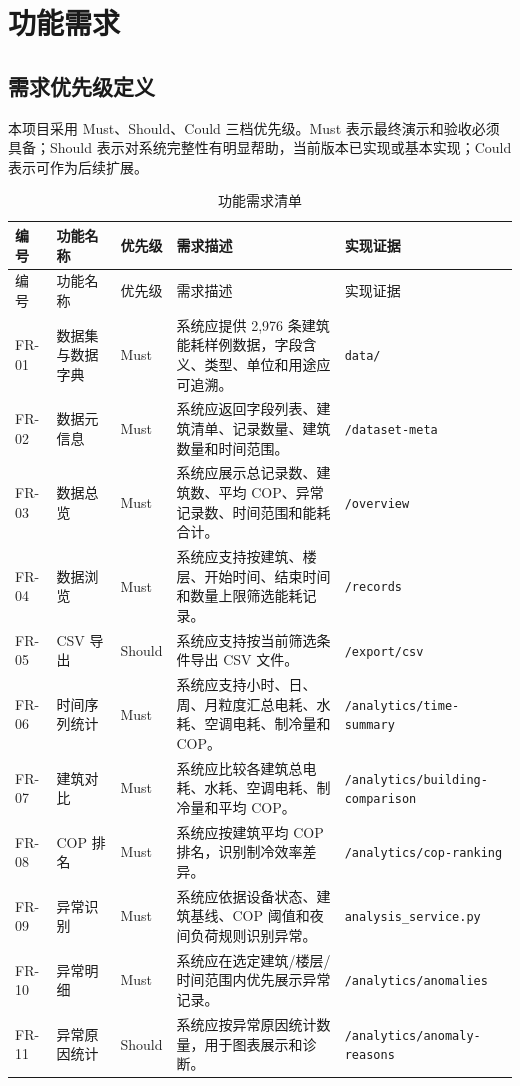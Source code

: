 \documentclass[12pt,a4paper]{ctexart}
\newcommand{\code}[1]{{\footnotesize\nolinkurl{#1}}}
\begin{document}
\section{功能需求}
\subsection{需求优先级定义}
本项目采用 Must、Should、Could 三档优先级。Must 表示最终演示和验收必须具备；Should 表示对系统完整性有明显帮助，当前版本已实现或基本实现；Could 表示可作为后续扩展。

\begin{longtable}{p{2cm}p{3.5cm}p{1.7cm}p{5.3cm}p{2.2cm}}
\caption{功能需求清单}\\
\toprule
编号 & 功能名称 & 优先级 & 需求描述 & 实现证据 \\
\midrule
\endfirsthead
\toprule
编号 & 功能名称 & 优先级 & 需求描述 & 实现证据 \\
\midrule
\endhead
FR-01 & 数据集与数据字典 & Must & 系统应提供 2,976 条建筑能耗样例数据，字段含义、类型、单位和用途应可追溯。 & \code{data/} \\
FR-02 & 数据元信息 & Must & 系统应返回字段列表、建筑清单、记录数量、建筑数量和时间范围。 & \code{/dataset-meta} \\
FR-03 & 数据总览 & Must & 系统应展示总记录数、建筑数、平均 COP、异常记录数、时间范围和能耗合计。 & \code{/overview} \\
FR-04 & 数据浏览 & Must & 系统应支持按建筑、楼层、开始时间、结束时间和数量上限筛选能耗记录。 & \code{/records} \\
FR-05 & CSV 导出 & Should & 系统应支持按当前筛选条件导出 CSV 文件。 & \code{/export/csv} \\
FR-06 & 时间序列统计 & Must & 系统应支持小时、日、周、月粒度汇总电耗、水耗、空调电耗、制冷量和 COP。 & \code{/analytics/time-summary} \\
FR-07 & 建筑对比 & Must & 系统应比较各建筑总电耗、水耗、空调电耗、制冷量和平均 COP。 & \code{/analytics/building-comparison} \\
FR-08 & COP 排名 & Must & 系统应按建筑平均 COP 排名，识别制冷效率差异。 & \code{/analytics/cop-ranking} \\
FR-09 & 异常识别 & Must & 系统应依据设备状态、建筑基线、COP 阈值和夜间负荷规则识别异常。 & \code{analysis_service.py} \\
FR-10 & 异常明细 & Must & 系统应在选定建筑/楼层/时间范围内优先展示异常记录。 & \code{/analytics/anomalies} \\
FR-11 & 异常原因统计 & Should & 系统应按异常原因统计数量，用于图表展示和诊断。 & \code{/analytics/anomaly-reasons} \\

\end{longtable}
\end{document}
